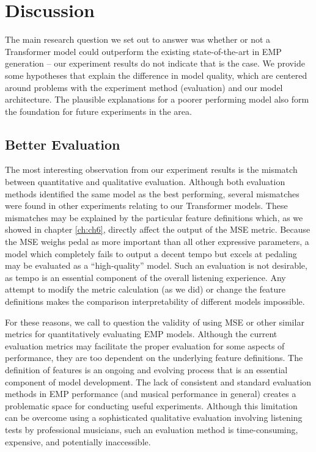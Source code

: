 \chapter{Discussion} \label{ch:ch7}
The main research question we set out to answer was whether or not a Transformer model could outperform the existing state-of-the-art in EMP generation -- our experiment results do not indicate that is the case. We provide some hypotheses that explain the difference in model quality, which are centered around problems with the experiment method (evaluation) and our model architecture. The plausible explanations for a poorer performing model also form the foundation for future experiments in the area.

\section{Better Evaluation}
The most interesting observation from our experiment results is the mismatch between quantitative and qualitative evaluation. Although both evaluation methods identified the same model as the best performing, several mismatches were found in other experiments relating to our Transformer models. These mismatches may be explained by the particular \vnetf{} feature definitions which, as we showed in chapter \ref{ch:ch6}, directly affect the output of the MSE metric. Because the \vnetf{} MSE weighs pedal as more important than all other expressive parameters, a model which completely fails to output a decent tempo but excels at pedaling may be evaluated as a ``high-quality'' model. Such an evaluation is not desirable, as tempo is an essential component of the overall listening experience. Any attempt to modify the metric calculation (as we did) or change the feature definitions makes the comparison interpretability of different models impossible. 

For these reasons, we call to question the validity of using MSE or other similar metrics for quantitatively evaluating EMP models. Although the current evaluation metrics may facilitate the proper evaluation for some aspects of performance, they are too dependent on the underlying feature definitions. The definition of features is an ongoing and evolving process that is an essential component of model development. The lack of consistent and standard evaluation methods in EMP performance (and musical performance in general) creates a problematic space for conducting useful experiments. Although this limitation can be overcome using a sophisticated qualitative evaluation involving listening tests by professional musicians, such an evaluation method is time-consuming, expensive, and potentially inaccessible. 

